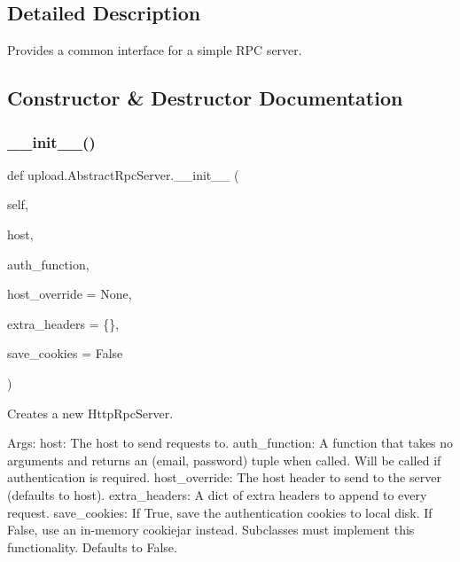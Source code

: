 \subsection{Detailed Description}
\begin{DoxyVerb}Provides a common interface for a simple RPC server.\end{DoxyVerb}
 

\subsection{Constructor \& Destructor Documentation}
\mbox{\label{classupload_1_1_abstract_rpc_server_a3f6bc1bd16b52bd5a5c33a1fedeef2d0}} 
\subsubsection{\texorpdfstring{\+\_\+\+\_\+init\+\_\+\+\_\+()}{\_\_init\_\_()}}
{\footnotesize\ttfamily def upload.\+Abstract\+Rpc\+Server.\+\_\+\+\_\+init\+\_\+\+\_\+ (\begin{DoxyParamCaption}\item[{}]{self,  }\item[{}]{host,  }\item[{}]{auth\+\_\+function,  }\item[{}]{host\+\_\+override = {\ttfamily None},  }\item[{}]{extra\+\_\+headers = {\ttfamily \{\}},  }\item[{}]{save\+\_\+cookies = {\ttfamily False} }\end{DoxyParamCaption})}

\begin{DoxyVerb}Creates a new HttpRpcServer.

Args:
  host: The host to send requests to.
  auth_function: A function that takes no arguments and returns an
(email, password) tuple when called. Will be called if authentication
is required.
  host_override: The host header to send to the server (defaults to host).
  extra_headers: A dict of extra headers to append to every request.
  save_cookies: If True, save the authentication cookies to local disk.
If False, use an in-memory cookiejar instead.  Subclasses must
implement this functionality.  Defaults to False.
\end{DoxyVerb}
 

